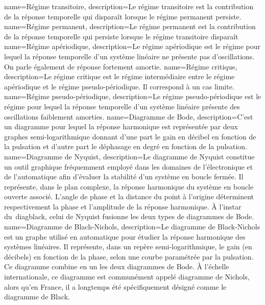 %
{%
  name={Régime transitoire},%
  description={Le régime transitoire est la contribution de la réponse 
  temporelle qui disparaît lorsque le régime permanent persiste.
  }
}
%
{%
  name={Régime permanent},%
  description={Le régime permanent est la contribution de la réponse temporelle 
  qui persiste lorsque le régime transitoire disparaît
  }
}
%
{%
  name={Régime apériodique},%
  description={Le régime apériodique est le régime pour lequel la réponse 
  temporelle d'un système linéaire ne présente pas d'oscillations. On parle
  également de réponse fortement amortie.
  }
}
%
{%
  name={Régime critique},%
  description={Le régime critique est le régime intermédiaire entre le régime
      apériodique et le régime pseudo-périodique. Il correspond à un cas limite.
  }
}
%
{%
  name={Régime pseudo-périodique},%
  description={Le régime pseudo-périodique est le régime pour lequel la réponse
  temporelle d'un système linéaire présente des oscillations faiblement 
  amorties.
  }
}
%
{%
  name={Diagramme de Bode},%
  description={C'est un diagramme pour lequel la réponse harmonique est 
  représentée par deux graphes semi-logarithmique donnant d'une part le gain 
  en décibel en fonction de la pulsation et d'autre part le déphasage en degré
  en fonction de la pulsation.
  }
}
%
{%
  name={Diagramme de Nyquist},%
  description={Le diagramme de Nyquist constitue un outil graphique fréquemment 
               employé dans les domaines de l'électronique et de l'automatique 
               afin d'évaluer la stabilité d'un système en boucle fermée. Il 
               représente, dans le plan complexe, la réponse harmonique du 
               système en boucle ouverte associé. L'angle de phase et la distance 
               du point à l'origine déterminent respectivement la phase 
               et l'amplitude de la réponse harmonique. À l'instar du~\gls{diagblack}, 
               celui de Nyquist fusionne les deux types de diagrammes de Bode.} 
}
%
{%
  name={Diagramme de Blach-Nichols},%
  description={Le diagramme de Black-Nichols est un graphe 
               utilisé en automatique pour étudier la réponse harmonique
               des systèmes linéaires. Il représente, dans un repère 
               semi-logarithmique, le gain (en décibels) en fonction 
               de la phase, selon une courbe paramétrée par la pulsation. 
               Ce diagramme combine en un les deux diagrammes de Bode. 
               À l'échelle internationale, ce diagramme est communément 
               appelé diagramme de Nichols, alors qu'en France, 
               il a longtemps été spécifiquement désigné comme le 
               diagramme de Black.}
}
